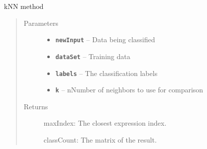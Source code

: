 \documentclass[letterpaper,10pt,english]{sphinxmanual}
\begin{document}
\begin{fulllineitems}
\label{Documentation of Code:classify.knn.kNNClassify}
kNN method
\begin{quote}\begin{description}
\item[{Parameters}] \leavevmode\begin{itemize}
\item {} 
\textbf{\texttt{newInput}} -- Data being classified

\item {} 
\textbf{\texttt{dataSet}} -- Training data

\item {} 
\textbf{\texttt{labels}} -- The classification labels

\item {} 
\textbf{\texttt{k}} -- nNumber of neighbors to use for comparison

\end{itemize}

\item[{Returns}] \leavevmode

maxIndex: The closest expression index.

classCount: The matrix of the result.


\end{description}\end{quote}

\end{fulllineitems}

\end{document}
